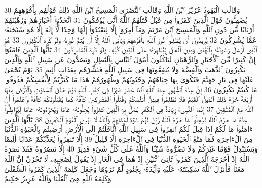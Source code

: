 {\tiny\colorbox{cl_aya}{30}} وَقَالَتِ ٱلْيَهُودُ عُزَيْرٌ ٱبْنُ ٱللَّهِ وَقَالَتِ ٱلنَّصَٰرَى ٱلْمَسِيحُ ٱبْنُ ٱللَّهِ ذَٰلِكَ قَوْلُهُم بِأَفْوَٰهِهِمْ يُضَٰهِـُٔونَ قَوْلَ ٱلَّذِينَ كَفَرُوا۟ مِن قَبْلُ قَٰتَلَهُمُ ٱللَّهُ أَنَّىٰ يُؤْفَكُونَ
{\tiny\colorbox{cl_aya}{31}} ٱتَّخَذُوٓا۟ أَحْبَارَهُمْ وَرُهْبَٰنَهُمْ أَرْبَابًا مِّن دُونِ ٱللَّهِ وَٱلْمَسِيحَ ٱبْنَ مَرْيَمَ وَمَآ أُمِرُوٓا۟ إِلَّا لِيَعْبُدُوٓا۟ إِلَٰهًا وَٰحِدًا لَّآ إِلَٰهَ إِلَّا هُوَ سُبْحَٰنَهُۥ عَمَّا يُشْرِكُونَ
{\tiny\colorbox{cl_aya}{32}} يُرِيدُونَ أَن يُطْفِـُٔوا۟ نُورَ ٱللَّهِ بِأَفْوَٰهِهِمْ وَيَأْبَى ٱللَّهُ إِلَّآ أَن يُتِمَّ نُورَهُۥ وَلَوْ كَرِهَ ٱلْكَٰفِرُونَ
{\tiny\colorbox{cl_aya}{33}} هُوَ ٱلَّذِىٓ أَرْسَلَ رَسُولَهُۥ بِٱلْهُدَىٰ وَدِينِ ٱلْحَقِّ لِيُظْهِرَهُۥ عَلَى ٱلدِّينِ كُلِّهِۦ وَلَوْ كَرِهَ ٱلْمُشْرِكُونَ
{\tiny\colorbox{cl_aya}{34}} يَٰٓأَيُّهَا ٱلَّذِينَ ءَامَنُوٓا۟ إِنَّ كَثِيرًا مِّنَ ٱلْأَحْبَارِ وَٱلرُّهْبَانِ لَيَأْكُلُونَ أَمْوَٰلَ ٱلنَّاسِ بِٱلْبَٰطِلِ وَيَصُدُّونَ عَن سَبِيلِ ٱللَّهِ وَٱلَّذِينَ يَكْنِزُونَ ٱلذَّهَبَ وَٱلْفِضَّةَ وَلَا يُنفِقُونَهَا فِى سَبِيلِ ٱللَّهِ فَبَشِّرْهُم بِعَذَابٍ أَلِيمٍ
{\tiny\colorbox{cl_aya}{35}} يَوْمَ يُحْمَىٰ عَلَيْهَا فِى نَارِ جَهَنَّمَ فَتُكْوَىٰ بِهَا جِبَاهُهُمْ وَجُنُوبُهُمْ وَظُهُورُهُمْ هَٰذَا مَا كَنَزْتُمْ لِأَنفُسِكُمْ فَذُوقُوا۟ مَا كُنتُمْ تَكْنِزُونَ
{\tiny\colorbox{cl_aya}{36}} إِنَّ عِدَّةَ ٱلشُّهُورِ عِندَ ٱللَّهِ ٱثْنَا عَشَرَ شَهْرًا فِى كِتَٰبِ ٱللَّهِ يَوْمَ خَلَقَ ٱلسَّمَٰوَٰتِ وَٱلْأَرْضَ مِنْهَآ أَرْبَعَةٌ حُرُمٌ ذَٰلِكَ ٱلدِّينُ ٱلْقَيِّمُ فَلَا تَظْلِمُوا۟ فِيهِنَّ أَنفُسَكُمْ وَقَٰتِلُوا۟ ٱلْمُشْرِكِينَ كَآفَّةً كَمَا يُقَٰتِلُونَكُمْ كَآفَّةً وَٱعْلَمُوٓا۟ أَنَّ ٱللَّهَ مَعَ ٱلْمُتَّقِينَ
{\tiny\colorbox{cl_aya}{37}} إِنَّمَا ٱلنَّسِىٓءُ زِيَادَةٌ فِى ٱلْكُفْرِ يُضَلُّ بِهِ ٱلَّذِينَ كَفَرُوا۟ يُحِلُّونَهُۥ عَامًا وَيُحَرِّمُونَهُۥ عَامًا لِّيُوَاطِـُٔوا۟ عِدَّةَ مَا حَرَّمَ ٱللَّهُ فَيُحِلُّوا۟ مَا حَرَّمَ ٱللَّهُ زُيِّنَ لَهُمْ سُوٓءُ أَعْمَٰلِهِمْ وَٱللَّهُ لَا يَهْدِى ٱلْقَوْمَ ٱلْكَٰفِرِينَ
{\tiny\colorbox{cl_aya}{38}} يَٰٓأَيُّهَا ٱلَّذِينَ ءَامَنُوا۟ مَا لَكُمْ إِذَا قِيلَ لَكُمُ ٱنفِرُوا۟ فِى سَبِيلِ ٱللَّهِ ٱثَّاقَلْتُمْ إِلَى ٱلْأَرْضِ أَرَضِيتُم بِٱلْحَيَوٰةِ ٱلدُّنْيَا مِنَ ٱلْءَاخِرَةِ فَمَا مَتَٰعُ ٱلْحَيَوٰةِ ٱلدُّنْيَا فِى ٱلْءَاخِرَةِ إِلَّا قَلِيلٌ
{\tiny\colorbox{cl_aya}{39}} إِلَّا تَنفِرُوا۟ يُعَذِّبْكُمْ عَذَابًا أَلِيمًا وَيَسْتَبْدِلْ قَوْمًا غَيْرَكُمْ وَلَا تَضُرُّوهُ شَيْـًٔا وَٱللَّهُ عَلَىٰ كُلِّ شَىْءٍ قَدِيرٌ
{\tiny\colorbox{cl_aya}{40}} إِلَّا تَنصُرُوهُ فَقَدْ نَصَرَهُ ٱللَّهُ إِذْ أَخْرَجَهُ ٱلَّذِينَ كَفَرُوا۟ ثَانِىَ ٱثْنَيْنِ إِذْ هُمَا فِى ٱلْغَارِ إِذْ يَقُولُ لِصَٰحِبِهِۦ لَا تَحْزَنْ إِنَّ ٱللَّهَ مَعَنَا فَأَنزَلَ ٱللَّهُ سَكِينَتَهُۥ عَلَيْهِ وَأَيَّدَهُۥ بِجُنُودٍ لَّمْ تَرَوْهَا وَجَعَلَ كَلِمَةَ ٱلَّذِينَ كَفَرُوا۟ ٱلسُّفْلَىٰ وَكَلِمَةُ ٱللَّهِ هِىَ ٱلْعُلْيَا وَٱللَّهُ عَزِيزٌ حَكِيمٌ

